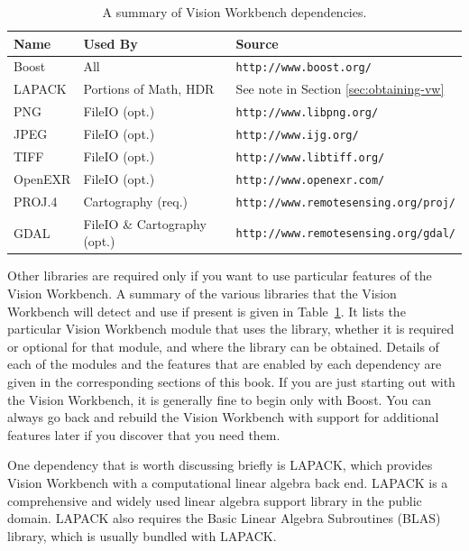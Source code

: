 \begin{table}[t]\begin{centering}
\begin{tabular}{|l|l|l|} \hline
Name    & Used By            & Source                                    \\ \hline \hline
Boost   & All                & \verb#http://www.boost.org/#              \\ \hline
LAPACK  & Portions of Math, HDR & See note in Section \ref{sec:obtaining-vw}              \\ \hline
PNG     & FileIO (opt.)      & \verb#http://www.libpng.org/#             \\ \hline
JPEG    & FileIO (opt.)      & \verb#http://www.ijg.org/#                \\ \hline
TIFF    & FileIO (opt.)      & \verb#http://www.libtiff.org/#            \\ \hline
OpenEXR & FileIO (opt.)      & \verb#http://www.openexr.com/#            \\ \hline
PROJ.4  & Cartography (req.) & \verb#http://www.remotesensing.org/proj/# \\ \hline
GDAL    & FileIO \& Cartography (opt.) & \verb#http://www.remotesensing.org/gdal/# \\ \hline
\end{tabular}
\caption{A summary of Vision Workbench dependencies.}
\label{tbl:dependencies}
\end{centering}\end{table}

Other libraries are required only if you want to use particular
features of the Vision Workbench.  A summary of the various libraries
that the Vision Workbench will detect and use if present is given in
Table~\ref{tbl:dependencies}.  It lists the particular Vision
Workbench module that uses the library, whether it is required or
optional for that module, and where the library can be obtained.
Details of each of the modules and the features that are enabled by
each dependency are given in the corresponding sections of this book.
If you are just starting out with the Vision Workbench, it is
generally fine to begin only with Boost.  You can always go back and 
rebuild the Vision Workbench with support for additional features 
later if you discover that you need them.

One dependency that is worth discussing briefly is LAPACK, which
provides Vision Workbench with a computational linear algebra back
end.  LAPACK is a comprehensive and widely used linear algebra support
library in the public domain.  LAPACK also requires the Basic Linear
Algebra Subroutines (BLAS) library, which is usually bundled with
LAPACK.

